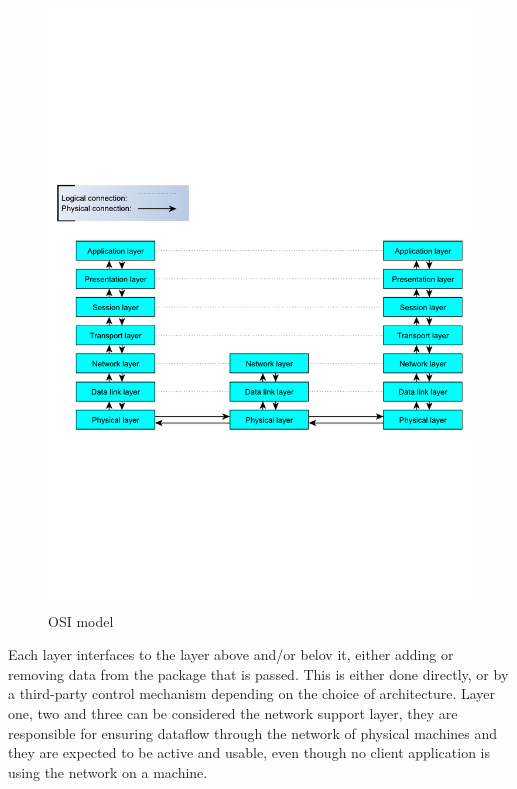 \begin{figure}[htb]
	\begin{center}
	\includegraphics[scale=0.5,trim=0 0 0 0]{content/graphics/OsiStack.pdf} %
	\caption{OSI model}
	\label{fig:osi_model_stack}			%
	\end{center}
\end{figure}






Each layer interfaces to the layer above and/or belov it, either adding or removing data from the package that is passed. This is either done directly, or by a third-party control mechanism depending on the choice of architecture.
Layer one, two and three can be considered the network support layer, they are responsible for ensuring dataflow through the network of physical machines and they are expected to be active and usable, even though no client application is using the network on a machine.

